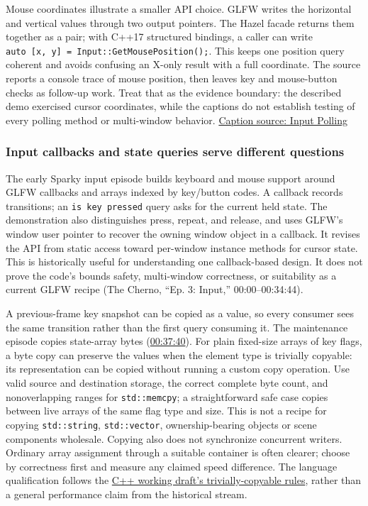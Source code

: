 Mouse coordinates illustrate a smaller API choice. GLFW writes the horizontal and vertical values through two output pointers. The Hazel facade returns them together as a pair; with C++17 structured bindings, a caller can write \texttt{auto\ {[}x,\ y{]}\ =\ Input::GetMousePosition();}. This keeps one position query coherent and avoids confusing an X-only result with a full coordinate. The source reports a console trace of mouse position, then leaves key and mouse-button checks as follow-up work. Treat that as the evidence boundary: the described demo exercised cursor coordinates, while the captions do not establish testing of every polling method or multi-window behavior. \href{https://www.youtube.com/watch?v=yuhNj8yGDJQ}{Caption source: Input Polling}

\subsubsection{Input callbacks and state queries serve different questions}\label{05-engine-i-ch013-input-callbacks-and-state-queries-serve-different-questions}

The early Sparky input episode builds keyboard and mouse support around GLFW callbacks and arrays indexed by key/button codes. A callback records transitions; an \texttt{is\ key\ pressed} query asks for the current held state. The demonstration also distinguishes press, repeat, and release, and uses GLFW's window user pointer to recover the owning window object in a callback. It revises the API from static access toward per-window instance methods for cursor state. This is historically useful for understanding one callback-based design. It does not prove the code's bounds safety, multi-window correctness, or suitability as a current GLFW recipe (The Cherno, ``Ep. 3: Input,'' 00:00--00:34:44).

A previous-frame key snapshot can be copied as a value, so every consumer sees the same transition rather than the first query consuming it. The maintenance episode copies state-array bytes (\href{https://www.youtube.com/watch?v=CKhGMoTNPOo&t=2260}{00:37:40}). For plain fixed-size arrays of key flags, a byte copy can preserve the values when the element type is trivially copyable: its representation can be copied without running a custom copy operation. Use valid source and destination storage, the correct complete byte count, and nonoverlapping ranges for \texttt{std::memcpy}; a straightforward safe case copies between live arrays of the same flag type and size. This is not a recipe for copying \texttt{std::string}, \texttt{std::vector}, ownership-bearing objects or scene components wholesale. Copying also does not synchronize concurrent writers. Ordinary array assignment through a suitable container is often clearer; choose by correctness first and measure any claimed speed difference. The language qualification follows the \href{https://eel.is/c++draft/basic.types\#basic.types.trivial}{C++ working draft's trivially-copyable rules}, rather than a general performance claim from the historical stream.

